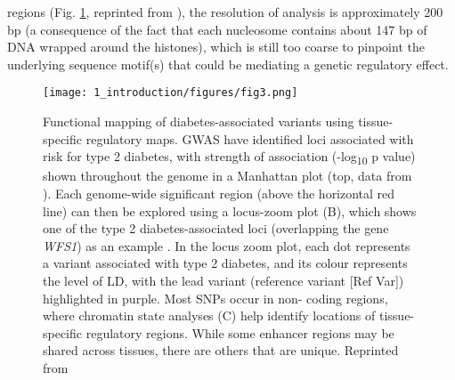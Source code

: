 regions (Fig. \ref{fig:ci_f3}, reprinted from \cite{kyonoGenomicAnnotationDiseaseassociated2019}), the resolution of analysis is approximately 200 bp (a consequence of the fact that each nucleosome contains about 147 bp of DNA wrapped around the histones), which is still too coarse to pinpoint the underlying sequence motif(s) that could be mediating a genetic regulatory effect. 


\begin{figure}
        \centering
        \texttt{[image: 1\_introduction/figures/fig3.png]}
        \caption{Functional mapping of diabetes-associated variants using tissue-specific regulatory maps. GWAS have identified loci associated with risk for type 2 diabetes, with strength of association (-log\textsubscript{10} p value) shown throughout the genome in a Manhattan plot (top, data from \cite{thediabetesgeneticsreplicationandmeta-analysisdiagramconsortiumLargescaleAssociationAnalysis2012,t2dknowledgeportalTypeDiabetesKnowledge2019}). Each genome-wide significant region (above the horizontal red line) can then be explored using a locus-zoom plot (B), which shows one of the type 2 diabetes-associated loci (overlapping the gene \textit{WFS1}) as an example \cite{t2dknowledgeportalTypeDiabetesKnowledge2019}. In the locus zoom plot, each dot represents a variant associated with type 2 diabetes, and its colour represents the level of LD, with the lead variant (reference variant [Ref Var]) highlighted in purple. Most SNPs occur in non- coding regions, where chromatin state analyses (C) help identify locations of tissue-specific regulatory regions. While some enhancer regions may be shared across tissues, there are others that are unique. Reprinted from \cite{kyonoGenomicAnnotationDiseaseassociated2019}}
        \label{fig:ci_f3}
\end{figure}


